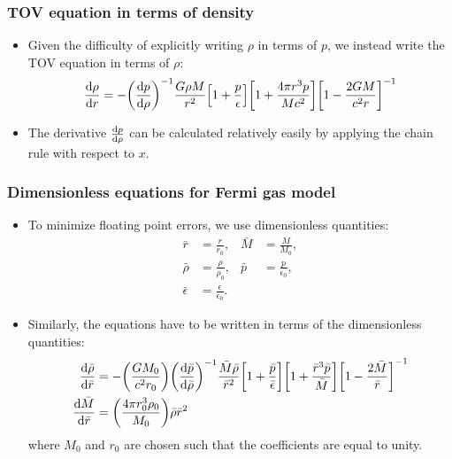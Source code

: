 \documentclass[hperref={pdfpagelabels=false}]{beamer}
\begin{document}
\begin{frame}
    \frametitle{TOV equation in terms of density}
    \begin{itemize}
        \item Given the difficulty of explicitly writing $\rho$ in terms of $p$, we instead write the TOV equation in terms of $\rho$: \[\dv{\rho}{r}=-\qty(\dv{p}{\rho})^{-1}\frac{G\rho M}{r^{2}}\qty[1+\frac{p}{\epsilon}]\qty[1+\frac{4\pi r^{3}p}{Mc^{2}}]\qty[1-\frac{2GM}{c^{2}r}]^{-1}\]
        \item The derivative $\dv{p}{\rho}$ can be calculated relatively easily by applying the chain rule with respect to $x$.
    \end{itemize}
\end{frame}

\begin{frame}
    \frametitle{Dimensionless equations for Fermi gas model}
    \begin{itemize}
        \item To minimize floating point errors, we use dimensionless quantities:
            \begin{align*}
                \bar{r}&=\frac{r}{r_{0}},&\bar{M}&=\frac{M}{M_{0}},\\
                \bar{\rho}&=\frac{\rho}{\rho_{0}},&\bar{p}&=\frac{p}{\epsilon_{0}},\\
                \bar{\epsilon}&=\frac{\epsilon}{\epsilon_{0}}.
            \end{align*}
        \item Similarly, the equations have to be written in terms of the dimensionless quantities:
            \begin{align*}
                \dv{\bar{\rho}}{\bar{r}}&=-\qty(\frac{GM_{0}}{c^{2}r_{0}})\qty(\dv{\bar{p}}{\bar{\rho}})^{-1}\frac{\bar{M}\bar{\rho}}{\bar{r}^{2}}\qty[1+\frac{\bar{p}}{\bar{\epsilon}}]\qty[1+\frac{\bar{r}^{3}\bar{p}}{\bar{M}}]\qty[1-\frac{2\bar{M}}{\bar{r}}]^{-1}\\
                \dv{\bar{M}}{\bar{r}}&=\qty(\frac{4\pi r_{0}^{3}\rho_{0}}{M_{0}})\bar{\rho}\bar{r}^{2}
            \end{align*}
            where $M_{0}$ and $r_{0}$ are chosen such that the coefficients are equal to unity.
    \end{itemize}
\end{frame}
\end{document}
